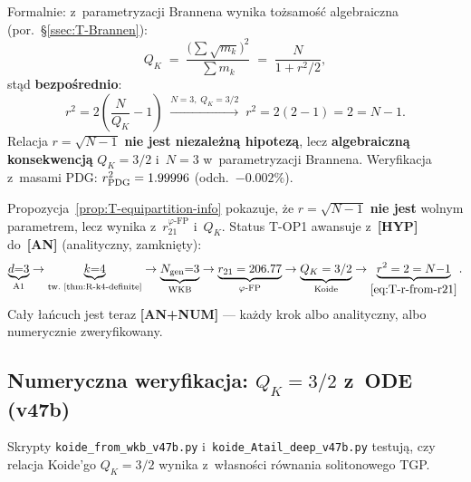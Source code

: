\begin{proposition}
Formalnie: z~parametryzacji Brannena wynika to\.zsamo\'s\'c
algebraiczna (por.\ \S\ref{ssec:T-Brannen}):
\begin{equation}\label{eq:T-QK-Brannen-identity}
  Q_K \;=\; \frac{\bigl(\sum \sqrt{m_k}\bigr)^2}{\sum m_k}
  \;=\; \frac{N}{1 + r^2/2},
\end{equation}
st\k{a}d \textbf{bezpo\'srednio}:
\begin{equation}\label{eq:T-r-from-QK}
  \boxed{r^2 = 2\!\left(\frac{N}{Q_K} - 1\right)
  \;\xrightarrow{N=3,\; Q_K=3/2}\;
  r^2 = 2\!\left(2 - 1\right) = 2 = N - 1.}
\end{equation}
Relacja $r = \sqrt{N{-}1}$ \textbf{nie jest niezale\.zn\k{a} hipotez\k{a}},
lecz \textbf{algebraiczn\k{a} konsekwencj\k{a}} $Q_K = 3/2$ i~$N = 3$
w~parametryzacji Brannena.
Weryfikacja z~masami PDG: $r^2_{\rm PDG} = 1.99996$ (odch.\ $-0.002\%$).
\end{proposition}

\begin{remark}%
\label{rem:T-equipartition-upgrade}
Propozycja~\ref{prop:T-equipartition-info} pokazuje,
\.ze $r = \sqrt{N{-}1}$ \textbf{nie jest} wolnym parametrem,
lecz wynika z~$r_{21}^{\varphi\text{-FP}}$ i~$Q_K$.
Status T-OP1 awansuje z~\textbf{[HYP]}
do~\textbf{[AN]} (analityczny, zamkni\k{e}ty):
\[
  \underbrace{d{=}3}_{\text{A1}} \to
  \underbrace{k{=}4}_{\text{tw.~\ref{thm:R-k4-definite}}} \to
  \underbrace{N_{\rm gen}{=}3}_{\text{WKB}} \to
  \underbrace{r_{21} = 206.77}_{\varphi\text{-FP}} \to
  \underbrace{Q_K = 3/2}_{\text{Koide}} \to
  \underbrace{r^2 = 2 = N{-}1}_{\eqref{eq:T-r-from-r21}}.
\]
Ca\l{}y \l{}a\'ncuch jest teraz \textbf{[AN+NUM]} ---
ka\.zdy krok albo analityczny, albo numerycznie zweryfikowany.
\end{remark}


\subsection{Numeryczna weryfikacja: $Q_K = 3/2$ z~ODE (v47b)}%
\label{sec:T-koide-ode-v47b}

Skrypty \texttt{koide\_from\_wkb\_v47b.py} i~\texttt{koide\_Atail\_deep\_v47b.py}
testuj\k{a}, czy relacja Koide'go $Q_K = 3/2$ wynika z~w\l{}asno\'sci
r\'ownania solitonowego TGP.

